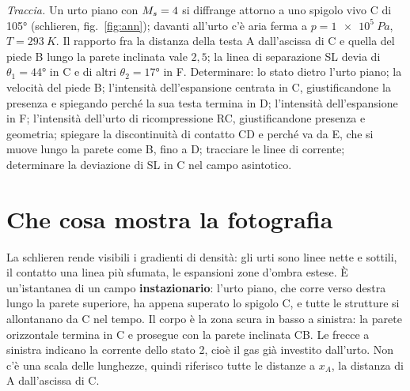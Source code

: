 

\graphicspath{{../../svolgimenti/2023-02-13_B70-E01_diffrazione_urto/figure/}}



\maketitle

\emph{Traccia.} Un urto piano con $M_{s}=4$ si diffrange attorno a uno spigolo vivo C di \ang{105} (schlieren,
fig.~\ref{fig:ann}); davanti all'urto c'è aria ferma a $p=\SI{1e5}{Pa}$, $T=\SI{293}{K}$. Il rapporto fra la distanza
della testa A dall'ascissa di C e quella del piede B lungo la parete inclinata vale $2{,}5$; la linea di separazione
SL devia di $\theta_1=\ang{44}$ in C e di altri $\theta_2=\ang{17}$ in F. Determinare: lo stato dietro l'urto piano; la
velocità del piede B; l'intensità dell'espansione centrata in C, giustificandone la presenza e spiegando perché la sua
testa termina in D; l'intensità dell'espansione in F; l'intensità dell'urto di ricompressione RC, giustificandone
presenza e geometria; spiegare la discontinuità di contatto CD e perché va da E, che si muove lungo la parete come B,
fino a D; tracciare le linee di corrente; determinare la deviazione di SL in C nel campo asintotico.

\section*{Che cosa mostra la fotografia}
La schlieren rende visibili i gradienti di densità: gli urti sono linee nette e sottili, il contatto una linea più
sfumata, le espansioni zone d'ombra estese. È un'istantanea di un campo \textbf{instazionario}: l'urto piano, che corre
verso destra lungo la parete superiore, ha appena superato lo spigolo C, e tutte le strutture si allontanano da C nel
tempo. Il corpo è la zona scura in basso a sinistra: la parete orizzontale termina in C e prosegue con la parete
inclinata CB. Le frecce a sinistra indicano la corrente dello stato 2, cioè il gas già investito dall'urto. Non c'è una
scala delle lunghezze, quindi riferisco tutte le distanze a $x_A$, la distanza di A dall'ascissa di C.

